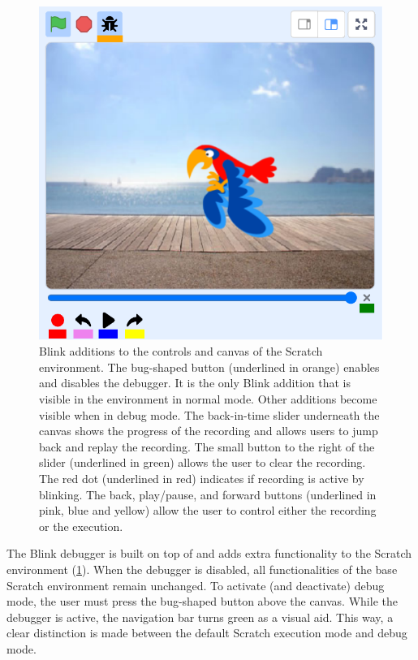 \documentclass[../main]{subfiles}
\begin{document}
\begin{figure}
    \centering
    \includegraphics[width=\textwidth]{ide}
    \caption{
        Blink additions to the controls and canvas of the Scratch environment.
        The bug-shaped button (underlined in orange) enables and disables the debugger.
        It is the only Blink addition that is visible in the environment in normal mode.
        Other additions become visible when in debug mode.
        The back-in-time slider underneath the canvas shows the progress of the recording and allows users to jump back and replay the recording.
        The small button to the right of the slider (underlined in green) allows the user to clear the recording.
        The red dot (underlined in red) indicates if recording is active by blinking.
        The back, play/pause, and forward buttons (underlined in pink, blue and yellow) allow the user to control either the recording or the execution.
    }
    \label{fig:blink-ide}
\end{figure}

The Blink debugger is built on top of and adds extra functionality to the Scratch environment (\cref{fig:blink-ide}).
When the debugger is disabled, all functionalities of the base Scratch environment remain unchanged.
To activate (and deactivate) debug mode, the user must press the bug-shaped button above the canvas.
While the debugger is active, the navigation bar turns green as a visual aid.
This way, a clear distinction is made between the default Scratch execution mode and debug mode.
\end{document}
